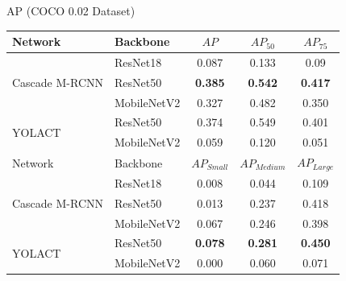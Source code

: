 \documentclass[18pt]{beamer}
\begin{document}
\begin{frame}{AP (COCO 0.02 Dataset)}
\begin{table}[H]
    \centering
    \begin{tabular}{ll | ccc}
        \toprule
        Network                                           & Backbone          & $AP$                    & $AP_{50}$         & $AP_{75}$ \\
        \midrule
        \multirow{3}{*}{Cascade M-RCNN}   & ResNet18          &  0.087 &  0.133 &  0.09 \\
        \multirow{1}{*}{}                               & ResNet50          & \textbf{0.385} &  \textbf{0.542} &  \textbf{0.417} \\
        \multirow{1}{*}{}                               & MobileNetV2     &  0.327 &  0.482 &  0.350\\
        \cline{3-5}
        \multirow{2}{*}{YOLACT}         & ResNet50     &  0.374 &  0.549 &  0.401 \\
        \multirow{1}{*}{}               & MobileNetV2   &  0.059 &  0.120 &  0.051 \\
        \midrule
        Network                         & Backbone      & $AP_{Small}$      & $AP_{Medium}$     & $AP_{Large}$ \\
        \midrule
        \multirow{3}{*}{Cascade M-RCNN} & ResNet18      &     0.008 &      0.044 &     0.109 \\
        \multirow{1}{*}{}               & ResNet50      &     0.013 &      0.237 &     0.418\\
        \multirow{1}{*}{}               & MobileNetV2   &   0.067 &      0.246 &     0.398  \\
        \cline{3-5}
        \multirow{2}{*}{YOLACT}         & ResNet50      &  \textbf{0.078} &      \textbf{0.281} &     \textbf{0.450 }\\
        \multirow{1}{*}{}               & MobileNetV2   &   0.000 &      0.060 &     0.071 \\
        \bottomrule
    \end{tabular}
\end{table}
\end{frame}
\end{document}
